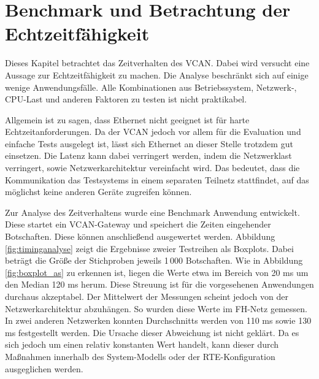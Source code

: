 \documentclass[
  a4paper,					    %
  twoside,
  DIV=calc,     				%
  bibliography=totoc,
  cleardoublepage=empty,
  ngerman,     					%
  final       					%
]{scrbook}
\begin{document}







% 
\section{Benchmark und Betrachtung der Echtzeitfähigkeit}
\label{sec:Benchmark}
Dieses Kapitel betrachtet das Zeitverhalten des VCAN. Dabei wird versucht eine Aussage zur Echtzeitfähigkeit zu machen. Die Analyse beschränkt sich auf einige wenige Anwendungsfälle. Alle Kombinationen aus Betriebssystem, Netzwerk-, CPU-Last und anderen Faktoren zu testen ist nicht praktikabel.

Allgemein ist zu sagen, dass Ethernet nicht geeignet ist für harte Echtzeitanforderungen. Da der VCAN jedoch vor allem für die Evaluation und einfache Tests ausgelegt ist, lässt sich Ethernet an dieser Stelle trotzdem gut einsetzen. Die Latenz kann dabei verringert werden, indem die Netzwerklast verringert, sowie Netzwerkarchitektur vereinfacht wird. Das bedeutet, dass die Kommunikation das Testsystems in einem separaten Teilnetz stattfindet, auf das möglichst keine anderen Geräte zugreifen können. 

Zur Analyse des Zeitverhaltens wurde eine Benchmark Anwendung entwickelt. Diese startet ein VCAN-Gateway und speichert die Zeiten eingehender Botschaften. Diese können anschließend ausgewertet werden. Abbildung \ref{fig:timinganalyse} zeigt die Ergebnisse zweier Testreihen als Boxplots. Dabei beträgt die Größe der Stichproben jeweils 1\,000 Botschaften. Wie in Abbildung \ref{fig:boxplot_as} zu erkennen ist, liegen die Werte etwa im Bereich von 20 ms um den Median 120 ms herum. Diese Streuung ist für die vorgesehenen Anwendungen durchaus akzeptabel. Der Mittelwert der Messungen scheint jedoch von der Netzwerkarchitektur abzuhängen. So wurden diese Werte im FH-Netz gemessen. In zwei anderen Netzwerken konnten Durchschnitts werden von 110 ms sowie 130 ms festgestellt werden. Die Ursache dieser Abweichung ist nicht geklärt. Da es sich jedoch um einen relativ konstanten Wert handelt, kann dieser durch Maßnahmen innerhalb des System-Modells oder der RTE-Konfiguration ausgeglichen werden.
\end{document}
